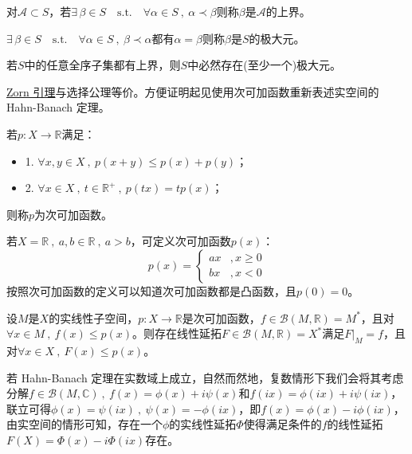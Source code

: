 \begin{definition}[上界]
对$\mathscr{A} \subset S$，若$\exists \, \beta \in S \quad \text{s.t.} \quad \forall \alpha \in S \ , \ \alpha \prec \beta$则称$\beta$是$\mathscr{A}$的上界。
\end{definition}
\begin{definition}[极大元]
$\exists \, \beta \in S \quad \text{s.t.} \quad \forall \alpha \in S \ , \ \beta \prec \alpha$都有$\alpha=\beta$则称$\beta$是$S$的极大元。
\end{definition}
\begin{theorem}[Zorn 引理]\label{Zorn}
若$S$中的任意全序子集都有上界，则$S$中必然存在(至少一个)极大元。
\end{theorem} 
\href{https://zh.wikipedia.org/wiki/%E4%BD%90%E6%81%A9%E5%BC%95%E7%90%86}{Zorn 引理}与选择公理等价。方便证明起见使用次可加函数重新表述实空间的 Hahn-Banach 定理。
\begin{definition}[次可加函数]
若$p:X \to \mathbb{R}$满足：
\begin{itemize}
\item 1. $\forall x,y \in X \ , \ p(x+y) \leq p(x) + p(y)$；
\item 2. $\forall x \in X \ , \ t \in \mathbb{R}^+ \ , \ p(tx)=tp(x)$；
\end{itemize}
则称$p$为次可加函数。
\end{definition}
\begin{example}
\quad 若$X=\mathbb{R} \ , \ a,b \in \mathbb{R} \ , \ a>b$，可定义次可加函数$p(x)$：
\[p(x)=\left\{\begin{array}{ll}
    ax & ,x \geq 0 \\
    bx & ,x<0    
\end{array}\right.\]
按照次可加函数的定义可以知道次可加函数都是凸函数，且$p(0)=0$。
\end{example}
\begin{theorem}[Hahn-Banach 定理，$\mathbb{K}=\mathbb{R}$]\label{theorem:ckjhb}
    设$M$是$X$的实线性子空间，$p:X \to \mathbb{R}$是次可加函数，$f \in \mathscr{B}(M,\mathbb{R})=M^*$，且对$\forall x \in M \ , \ f(x) \leq p(x)$。则存在线性延拓$F \in \mathscr{B}(M,\mathbb{R})=X^*$满足$F|_M=f$，且对$\forall x \in X \ , \ F(x) \leq p(x)$。
\end{theorem} 
\begin{remark}
\quad 若 Hahn-Banach 定理在实数域上成立，自然而然地，复数情形下我们会将其考虑分解$f \in \mathscr{B}(M,\mathbb{C}) \ , \ f(x)=\phi(x)+i\psi(x)$和$f(ix)=\phi(ix)+i\psi(ix)$，联立可得$\phi(x)=\psi(ix) \ , \ \psi(x)=-\phi(ix)$，即$f(x)=\phi(x)-i\phi(ix)$，由实空间的情形可知，存在一个$\phi$的实线性延拓$\Phi$使得满足条件的$f$的线性延拓$F(X)=\Phi(x)-i\Phi(ix)$存在。
\end{remark}
